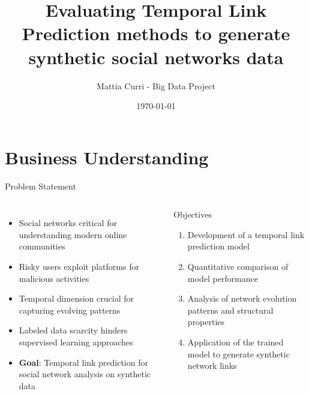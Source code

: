\documentclass[aspectratio=169,xcolor=dvipsnames]{beamer}
\title{Evaluating Temporal Link Prediction methods to generate synthetic social networks data}
\subtitle{} %
\author{Mattia Curri - Big Data Project}
\institute
{
}
\date{\today}
\begin{document}
\begin{frame}
	\titlepage
\end{frame}


\section{Business Understanding}

\begin{frame}{Problem Statement }
	\begin{columns}[c]
		\begin{itemize}
			\item Social networks critical for understanding modern online communities
			\item Risky users exploit platforms for malicious activities
			\item Temporal dimension crucial for capturing evolving patterns%
			\item Labeled data scarcity hinders supervised learning approaches
			\item \textbf{Goal}: Temporal link prediction for social network analysis on synthetic data
		\end{itemize}

		\begin{block}{Objectives}
			\begin{enumerate}
				\item Development of a temporal link prediction model
				\item Quantitative comparison of model performance
				\item Analysis of network evolution patterns and structural properties
				\item Application of the trained model to generate synthetic network links
			\end{enumerate}
		\end{block}
	\end{columns}
\end{frame}
\end{document}
